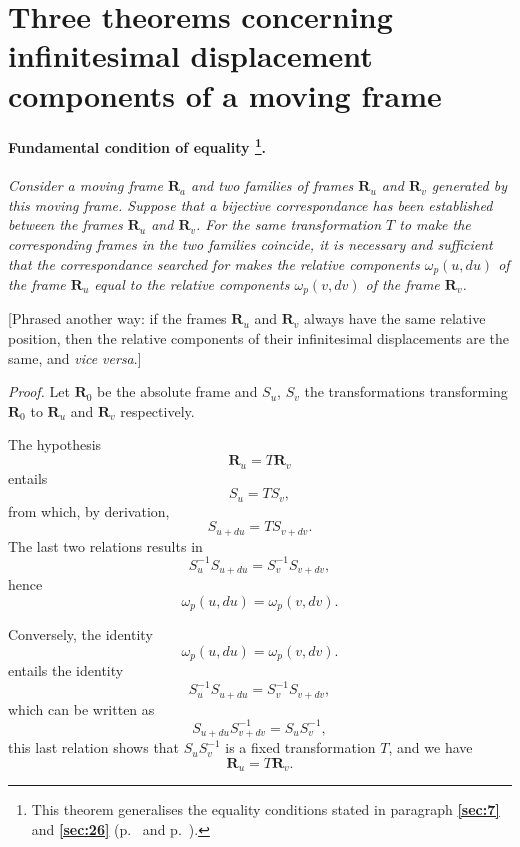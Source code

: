 \documentclass[leqno,11pt]{book}
\numberwithin{equation}{chapter}
\theoremstyle{shape1}
\theoremstyle{shapesmall}
\newcommand{\fsref}[1]{{\rm\textsection\textbf{\ref{sec:#1}}}}
\newcommand{\somespace}{\vspace{9pt}}
\begin{document}
\section[{Three theorems concerning infinitesimal displacement components of a moving frame}]{Three theorems concerning infinitesimal displacement components of a moving frame}
\label{sec:three-theor-conc}

\paragraph[{Fundamental condition of equality.}]{Fundamental condition of equality \footnote{This theorem generalises the equality conditions stated in paragraph \fsref{7} and \fsref{26} (p.~\pageref{sec:7} and p.~\pageref{sec:26}).}.}
\label{sec:76}
\emph{Consider a moving frame $\mathbf{R}_{a}$ and two families of frames $\mathbf{R}_{u}$ and $\mathbf{R}_{v}$ generated by this moving frame. Suppose that a bijective correspondance has been established between the frames $\mathbf{R}_{u}$ and $\mathbf{R}_{v}$. For the same transformation $T$ to make the corresponding frames in the two families coincide, it is necessary and sufficient that the correspondance searched for makes the relative components $\omega_{p}(u,du)$ of the frame $\mathbf{R}_{u}$ equal to the relative components $\omega_{p}(v,dv)$ of the frame $\mathbf{R}_{v}$.}

\somespace

[Phrased another way: if the frames $\mathbf{R}_{u}$ and $\mathbf{R}_{v}$ always have the same relative position, then the relative components of their infinitesimal displacements are the same, and \emph{vice versa}.]

\somespace

\emph{Proof.} Let $\mathbf{R}_{0}$ be the absolute frame and $S_{u}$, $S_{v}$ the transformations transforming $\mathbf{R}_{0}$ to $\mathbf{R}_{u}$ and $\mathbf{R}_{v}$ respectively.

The hypothesis
\[
\mathbf{R}_{u}=T\mathbf{R}_{v}
\]
entails
\[
S_{u}=TS_{v},
\]
from which, by derivation,
\[
S_{u+du}=TS_{v+dv}.
\]
The last two relations results in
\[
S_{u}^{-1}S_{u+du}=S_{v}^{-1}S_{v+dv},
\]
hence
\[
\omega_{p}(u,du)=\omega_{p}(v,dv).
\]

Conversely, the identity
\[
\omega_{p}(u,du)=\omega_{p}(v,dv).
\]
entails the identity
\[
S_{u}^{-1}S_{u+du}=S_{v}^{-1}S_{v+dv},
\]
which can be written as
\[
S_{u+du}S_{v+dv}^{-1}=S_{u}S_{v}^{-1},
\]
this last relation shows that $S_{u}S_{v}^{-1}$ is a fixed transformation $T$, and we have
\[
\mathbf{R}_{u}=T\mathbf{R}_{v}.
\]
\end{document}
